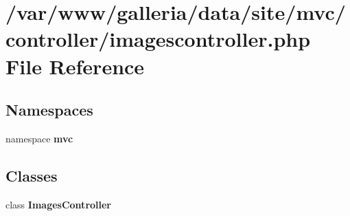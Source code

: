 \section{/var/www/galleria/data/site/mvc/controller/imagescontroller.php File Reference}
\label{imagescontroller_8php}
\subsection*{Namespaces}
\begin{CompactItemize}
\item 
namespace {\bf mvc}
\end{CompactItemize}
\subsection*{Classes}
\begin{CompactItemize}
\item 
class {\bf ImagesController}
\end{CompactItemize}
